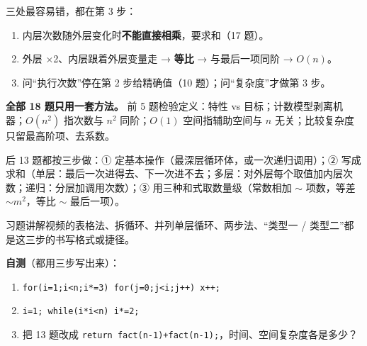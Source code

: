 \documentclass[10.5pt,a4paper,oneside]{article}
\providecommand{\tightlist}{\setlength{\itemsep}{2pt}\setlength{\parskip}{0pt}}
\begin{document}
\begin{exambox}

三处最容易错，都在第 3 步：

\begin{enumerate}
\def\labelenumi{\arabic{enumi}.}
\tightlist
\item
  内层次数随外层变化时\textbf{不能直接相乘}，要求和（17 题）。
\item
  外层 ×2、内层跟着外层变量走 → \textbf{等比} → 与最后一项同阶 →
  \(O(n)\)。
\item
  问“执行次数”停在第 2 步给精确值（10 题）；问“复杂度”才做第 3 步。
\end{enumerate}

\end{exambox}

\begin{summarybox}

\textbf{全部 18 题只用一套方法。} 前 5 题检验定义：特性 vs
目标；计数模型剥离机器；\(O(n^2)\) 指次数与 \(n^2\) 同阶；\(O(1)\)
空间指辅助空间与 \(n\) 无关；比较复杂度只留最高阶项、去系数。

后 13 题都按三步做：① 定基本操作（最深层循环体，或一次递归调用）；②
写成求和（单层：最后一次进得去、下一次进不去；多层：对外层每个取值加内层次数；递归：分层加调用次数）；③
用三种和式取数量级（常数相加 \(\sim\) 项数，等差 \(\sim m^2\)，等比
\(\sim\) 最后一项）。

习题讲解视频的表格法、拆循环、并列单层循环、两步法、“类型一 /
类型二”都是这三步的书写格式或捷径。

\textbf{自测}（都用三步写出来）：

\begin{enumerate}
\def\labelenumi{\arabic{enumi}.}
\tightlist
\item
  \texttt{for(i=1;i\textless{}n;i*=3)\ for(j=0;j\textless{}i;j++)\ x++;}
\item
  \texttt{i=1;\ while(i*i\textless{}n)\ i*=2;}
\item
  把 13 题改成
  \texttt{return\ fact(n-1)+fact(n-1);}，时间、空间复杂度各是多少？
\end{enumerate}

\end{summarybox}
\end{document}
